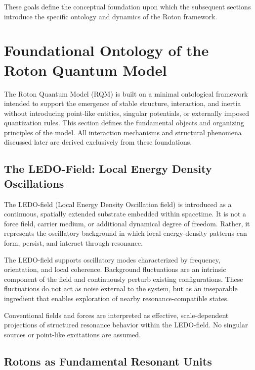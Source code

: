 \documentclass[11pt,a4paper]{article}
\begin{document}
These goals define the conceptual foundation upon which the subsequent sections introduce
the specific ontology and dynamics of the Roton framework.


\section{Foundational Ontology of the Roton Quantum Model}
\label{sec:foundational_ontology}

The Roton Quantum Model (RQM) is built on a minimal ontological framework intended to
support the emergence of stable structure, interaction, and inertia without introducing
point-like entities, singular potentials, or externally imposed quantization rules.
This section defines the fundamental objects and organizing principles of the model.
All interaction mechanisms and structural phenomena discussed later are derived exclusively
from these foundations.

\subsection{The LEDO-Field: Local Energy Density Oscillations}

The LEDO-field (Local Energy Density Oscillation field) is introduced as a continuous,
spatially extended substrate embedded within spacetime.
It is not a force field, carrier medium, or additional dynamical degree of freedom.
Rather, it represents the oscillatory background in which local energy-density patterns
can form, persist, and interact through resonance.

The LEDO-field supports oscillatory modes characterized by frequency, orientation, and
local coherence.
Background fluctuations are an intrinsic component of the field and continuously perturb
existing configurations.
These fluctuations do not act as noise external to the system, but as an inseparable
ingredient that enables exploration of nearby resonance-compatible states.

Conventional fields and forces are interpreted as effective, scale-dependent projections
of structured resonance behavior within the LEDO-field.
No singular sources or point-like excitations are assumed.

\subsection{Rotons as Fundamental Resonant Units}
\end{document}
